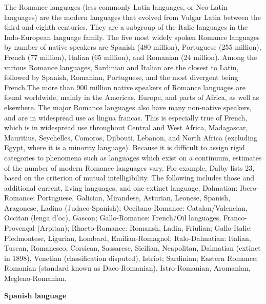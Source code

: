 \documentclass[11pt]{scrartcl} %
\begin{document}
The Romance languages (less commonly Latin languages, or Neo-Latin languages) are the modern languages that evolved from Vulgar Latin between the third and eighth centuries. They are a subgroup of the Italic languages in the Indo-European language family. The five most widely spoken Romance languages by number of native speakers are Spanish (480 million), Portuguese (255 million), French (77 million), Italian (65 million), and Romanian (24 million). Among the various Romance languages, Sardinian and Italian are the closest to Latin, followed by Spanish, Romanian, Portuguese, and the most divergent being French.The more than 900 million native speakers of Romance languages are found worldwide, mainly in the Americas, Europe, and parts of Africa, as well as elsewhere. The major Romance languages also have many non-native speakers, and are in widespread use as lingua francas. This is especially true of French, which is in widespread use throughout Central and West Africa, Madagascar, Mauritius, Seychelles, Comoros, Djibouti, Lebanon, and North Africa (excluding Egypt, where it is a minority language). Because it is difficult to assign rigid categories to phenomena such as languages which exist on a continuum, estimates of the number of modern Romance languages vary. For example, Dalby lists 23, based on the criterion of mutual intelligibility. The following includes those and additional current, living languages, and one extinct language, Dalmatian: Ibero-Romance: Portuguese, Galician, Mirandese, Asturian, Leonese, Spanish, Aragonese, Ladino (Judaeo-Spanish); Occitano-Romance: Catalan/Valencian, Occitan (lenga d'oc), Gascon; Gallo-Romance: French/Oïl languages, Franco-Provençal (Arpitan); Rhaeto-Romance: Romansh, Ladin, Friulian; Gallo-Italic: Piedmontese, Ligurian, Lombard, Emilian-Romagnol; Italo-Dalmatian: Italian, Tuscan, Romanesco, Corsican, Sassarese, Sicilian, Neapolitan, Dalmatian (extinct in 1898), Venetian (classification disputed), Istriot; Sardinian; Eastern Romance: Romanian (standard known as Daco-Romanian), Istro-Romanian, Aromanian, Megleno-Romanian. \par

\noindent \textbf{Spanish language} \par
\end{document}

